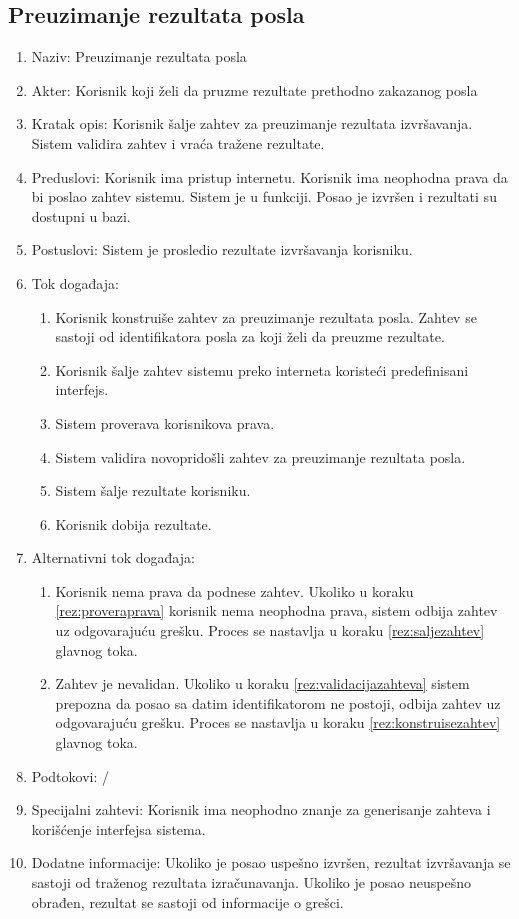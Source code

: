 \documentclass[12pt,oneside]{memoir}
\begin{document}
\subsection{Preuzimanje rezultata posla}
\begin{enumerate}
\item Naziv: Preuzimanje rezultata posla
\item Akter: Korisnik koji želi da pruzme rezultate prethodno zakazanog posla
\item Kratak opis: Korisnik šalje zahtev za preuzimanje rezultata izvršavanja. Sistem validira zahtev i vraća tražene rezultate.
\item Preduslovi: Korisnik ima pristup internetu. Korisnik ima neophodna prava da bi poslao zahtev sistemu. Sistem je u funkciji. Posao je izvršen i rezultati su dostupni u bazi.
\item Postuslovi: Sistem je prosledio rezultate izvršavanja korisniku.
\item Tok događaja:
	\begin{enumerate}
	\item \label{rez:konstruisezahtev} Korisnik konstruiše zahtev za preuzimanje rezultata posla. Zahtev se sastoji od identifikatora posla za koji želi da preuzme rezultate.
	\item \label{rez:saljezahtev} Korisnik šalje zahtev sistemu preko interneta koristeći predefinisani interfejs.
	\item \label{rez:proveraprava} Sistem proverava korisnikova prava.
	\item \label{rez:validacijazahteva} Sistem validira novopridošli zahtev za preuzimanje rezultata posla.
	\item \label{rez:sinhslanjerez} Sistem šalje rezultate korisniku.
	\item Korisnik dobija rezultate.
	\end{enumerate}
\item Alternativni tok događaja:
	\begin{enumerate}
	\item Korisnik nema prava da podnese zahtev. Ukoliko u koraku \ref{rez:proveraprava} korisnik nema neophodna prava, sistem odbija zahtev uz odgovarajuću grešku. Proces se nastavlja u koraku \ref{rez:saljezahtev} glavnog toka.
	\item Zahtev je nevalidan. Ukoliko u koraku \ref{rez:validacijazahteva} sistem prepozna da posao sa datim identifikatorom ne postoji, odbija zahtev uz odgovarajuću grešku. Proces se nastavlja u koraku \ref{rez:konstruisezahtev} glavnog toka.
	\end{enumerate}
\item Podtokovi: /
\item Specijalni zahtevi: Korisnik ima neophodno znanje za generisanje zahteva i korišćenje interfejsa sistema.
\item Dodatne informacije: Ukoliko je posao uspešno izvršen, rezultat izvršavanja se sastoji od traženog rezultata izračunavanja. Ukoliko je posao neuspešno obrađen, rezultat se sastoji od informacije o grešci.
\end{enumerate}
\end{document}
